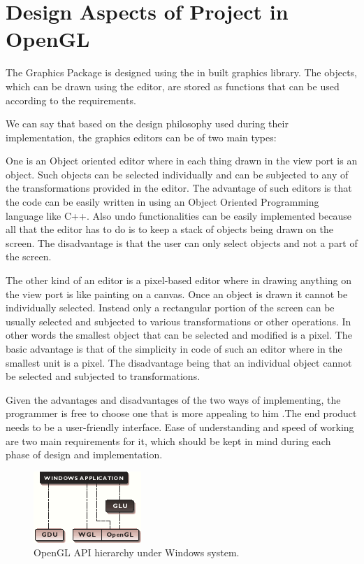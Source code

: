 \documentclass[12pt]{report}
\begin{document}
\section{Design Aspects of Project in OpenGL}
The Graphics Package is designed using the in built graphics library. The objects, which can be drawn using the editor, are stored as functions that can be used according to the requirements.



We can say that based on the design philosophy used during their implementation, the graphics editors can be of two main types:



One is an Object oriented editor where in each thing drawn in the view port is an object. Such objects can be selected individually and can be subjected to any of the transformations provided in the editor. The advantage of such editors is that the code can be easily written in using an Object Oriented Programming language like C++. Also undo functionalities can be easily implemented because all that the editor has to do is to keep a stack of objects being drawn on the screen. The disadvantage is that the user can only select objects and not a part of the screen.



The other kind of an editor is a pixel-based editor where in drawing anything on the view port is like painting on a canvas. Once an object is drawn it cannot be individually selected. Instead only a rectangular portion of the screen can be usually selected and subjected to various transformations or other operations. In other words the smallest object that can be selected and modified is a pixel. The basic advantage is that of the simplicity in code of such an editor where in the smallest unit is a pixel. The disadvantage being that an individual object cannot be selected and subjected to transformations.



Given the advantages and disadvantages of the two ways of implementing, the programmer is free to choose one that is more appealing to him .The end product needs to be a user-friendly interface. Ease of understanding and speed of working are two main requirements for it, which should be kept in mind during each phase of design and implementation.


\begin{figure}[h!]
	\centering
		\includegraphics[scale=1.0]{opengl_lib.png}
	\caption{OpenGL API hierarchy under Windows system.}
	\label{fig:logo2}
\end{figure}
\end{document}
